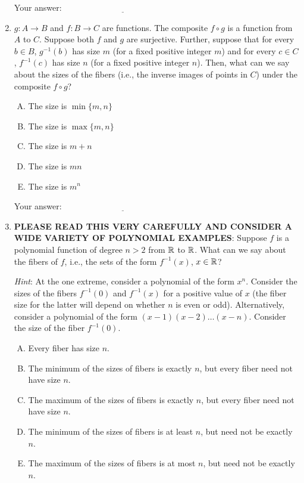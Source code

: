 \documentclass[10pt]{amsart}
\begin{document}
\begin{enumerate}
  \vspace{0.1in}
  Your answer: $\underline{\qquad\qquad\qquad\qquad\qquad\qquad\qquad}$
  \vspace{0.1in}

\item $g:A \to B$ and $f:B \to C$ are functions. The composite $f
  \circ g$ is a function from $A$ to $C$. Suppose both $f$ and $g$ are
  surjective. Further, suppose that for every $b \in B$, $g^{-1}(b)$
  has size $m$ (for a fixed positive integer $m$) and for every $c \in
  C$, $f^{-1}(c)$ has size $n$ (for a fixed positive integer
  $n$). Then, what can we say about the sizes of the fibers (i.e., the
  inverse images of points in $C$) under the composite $f \circ g$?

  \begin{enumerate}[(A)]
  \item The size is $\min \{ m,n \}$
  \item The size is $\max \{ m,n \}$
  \item The size is $m + n$
  \item The size is $mn$
  \item The size is $m^n$
  \end{enumerate}

  \vspace{0.1in}
  Your answer: $\underline{\qquad\qquad\qquad\qquad\qquad\qquad\qquad}$
  \vspace{0.1in}

\item {\bf PLEASE READ THIS VERY CAREFULLY AND CONSIDER A WIDE VARIETY
  OF POLYNOMIAL EXAMPLES}: Suppose $f$ is a polynomial function of
  degree $n > 2$ from $\mathbb{R}$ to $\mathbb{R}$. What can we say about the fibers
  of $f$, i.e., the sets of the form $f^{-1}(x)$, $x \in \mathbb{R}$?

  {\em Hint}: At the one extreme, consider a polynomial of the form
  $x^n$. Consider the sizes of the fibers $f^{-1}(0)$ and $f^{-1}(x)$
  for a positive value of $x$ (the fiber size for the latter will
  depend on whether $n$ is even or odd). Alternatively, consider a
  polynomial of the form $(x - 1)(x - 2) \dots (x - n)$. Consider the
  size of the fiber $f^{-1}(0)$.
  \begin{enumerate}[(A)]
  \item Every fiber has size $n$.
  \item The minimum of the sizes of fibers is exactly $n$, but every
    fiber need not have size $n$.
  \item The maximum of the sizes of fibers is exactly $n$, but every
    fiber need not have size $n$.
  \item The minimum of the sizes of fibers is at least $n$, but need
    not be exactly $n$.
  \item The maximum of the sizes of fibers is at most $n$, but need not
    be exactly $n$.
  \end{enumerate}


\end{enumerate}
\end{document}

